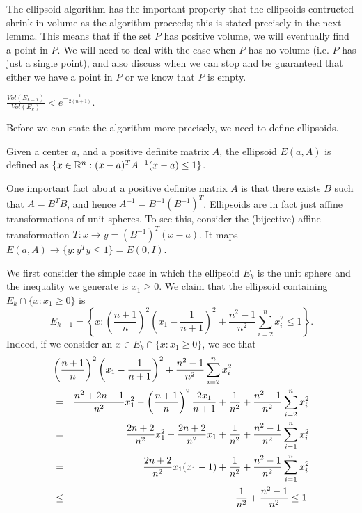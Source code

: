 \documentclass[12pt]{article}
\begin{document}
The ellipsoid algorithm has the important property that the ellipsoids
contructed shrink in volume as the algorithm proceeds; this is stated
precisely in the next lemma. This means that if the set $P$ has
positive volume, we will eventually find a point in $P$. We will need
to deal with the case when $P$ has no volume (i.e. $P$ has just a
single point), and also discuss when we can stop and be guaranteed
that either we have a point in $P$ or we know that $P$ is empty.  
\begin{lemma} \label{volume}
$\frac{Vol(E_{k+1})}{Vol(E_k)} < e^{-\frac{1}{2(n+1)}}$.
\end{lemma}

Before we can state the algorithm more precisely, we need to define
ellipsoids. 

\begin{definition}
Given a center $a$, and a positive definite matrix $A$, the ellipsoid 
$E(a,A)$ is defined as $\{x \in {\mathbb R}^n:(x-a)^T A^{-1}(x-a)\leq 1\}$. 
\end{definition}

One important fact about a positive definite matrix $A$ is that there
exists $B$ such that $A=B^TB$, and hence
$A^{-1}=B^{-1}(B^{-1})^T$. Ellipsoids are in fact just affine
transformations of unit spheres. To see this, consider the (bijective)
affine transformation $T: x \rightarrow y =(B^{-1})^T(x-a)$. It maps
$E(a,A)\rightarrow \{y:y^{T}y\leq 1\}=E(0,I)$.

We first consider the simple case in which the ellipsoid $E_k$ is the
unit sphere and the inequality we generate is $x_1\geq 0$. We
claim that the ellipsoid containing $E_k \cap \{ x:x_1\geq 0\}$ is 
$$E_{k+1}= \left\{x:
\left(\frac{n+1}{n}\right)^2\left(x_1-\frac{1}{n+1}\right)^2
+\frac{n^2-1}{n^2}\sum_{i=2}^n x_i^2 \leq 1\right\}. $$
Indeed, if we consider an $x\in E_k \cap \{x: x_1\geq 0\}$, we see
that 
\begin{eqnarray*}
\lefteqn{\left(\frac{n+1}{n}\right)^2\left(x_1-\frac{1}{n+1}\right)^2
+\frac{n^2-1}{n^2}\sum_{i=2}^n x_i^2} \\
& = & \frac{n^2+2n+1}{n^2}x_1^2
-\left(\frac{n+1}{n}\right)^2\frac{2x_1}{n+1}+\frac{1}{n^2}+ 
\frac{n^2-1}{n^2}\sum_{i=2}^n x_i^2  \\
& = &\frac{2n+2}{n^2}x_1^2 -\frac{2n+2}{n^2}x_1 +\frac{1}{n^2} +
\frac{n^2 -1}{n^2}\sum_{i=1}^n x_i^2  \\
& = & \frac{2n+2}{n^2} x_1 (x_1-1) +\frac{1}{n^2} +
\frac{n^2 -1}{n^2}\sum_{i=1}^n x_i^2  \\
&\leq& \frac{1}{n^2} + \frac{n^2 - 1}{n^2}\leq 1.
\end{eqnarray*}
\end{document}
